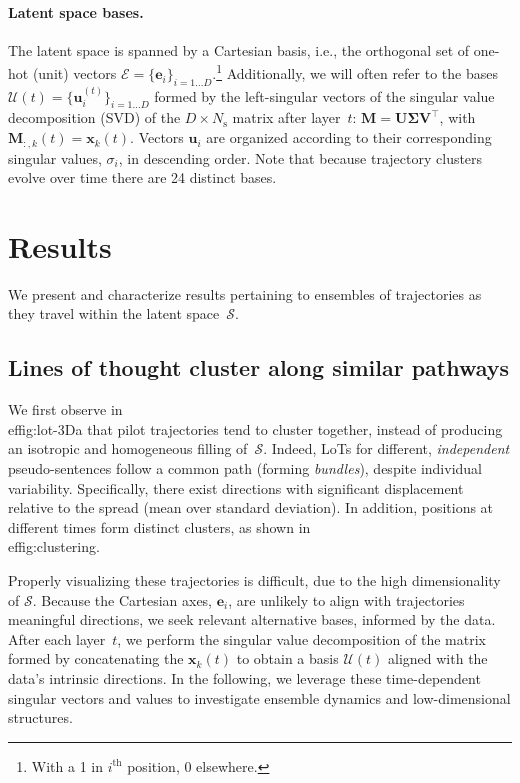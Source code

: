 \documentclass{article} %
\def\ve{{\bm{e}}}
\def\vu{{\bm{u}}}
\def\vx{{\bm{x}}}
\def\mM{{\bm{M}}}
\def\mU{{\bm{U}}}
\def\mV{{\bm{V}}}
\newcommand{\cje}[1]{{\color{red} CJE: #1}} %
\begin{document}
\paragraph{Latent space bases.}
The latent space is spanned by a Cartesian basis, i.e., the orthogonal set of one-hot (unit) vectors $\mathcal{E} = \{ \ve_i \}_{i = 1 \dots D}$.\footnote{With a 1 in $i^\mathrm{th}$ position, 0 elsewhere.}
Additionally, we will often refer to the bases $\mathcal{U}(t) = \{ \vu_i^{(t)} \}_{i = 1 \dots D}$ formed by the left-singular vectors of the singular value decomposition (SVD) of the $D\times N_\mathrm{s}$ matrix after layer~$t$: $\mM  = \mU \mathbf{\Sigma} \mV^{\top}$, with 
$\mM_{:, k}(t) = \vx_k(t)$.
Vectors $\vu_i$ are organized according to their corresponding singular values, $\sigma_i$, in descending order.
Note that because trajectory clusters evolve over time there are 24 distinct bases. 

\section{Results}
\label{sec:results}

We present and characterize results pertaining to ensembles of trajectories as they travel within the latent space~$\mathcal{S}$.

\subsection{Lines of thought cluster along similar pathways}

We first observe in \\ef{fig:lot-3D}a that pilot trajectories tend to cluster together, instead of producing an isotropic and homogeneous filling of~$\mathcal{S}$.
Indeed, LoTs for different, \emph{independent} pseudo-sentences follow a common path (forming \emph{bundles}), despite individual variability. 
Specifically, there exist directions with significant displacement relative to the spread (mean over standard deviation).
In addition, positions at different times form distinct clusters, as shown in \\ef{fig:clustering}. 

Properly visualizing these trajectories is difficult, due to the high dimensionality of $\mathcal{S}$.
Because the Cartesian axes, $\ve_i$, are unlikely to align with trajectories meaningful directions, we seek relevant alternative bases, informed by the data.
After each layer~$t$, we perform the singular value decomposition of the matrix formed by concatenating the $\vx_k(t)$ to obtain a basis $\mathcal{U}(t)$ aligned with the data's intrinsic directions. 
In the following, we leverage these time-dependent singular vectors and values to investigate ensemble dynamics and low-dimensional structures.
\end{document}
